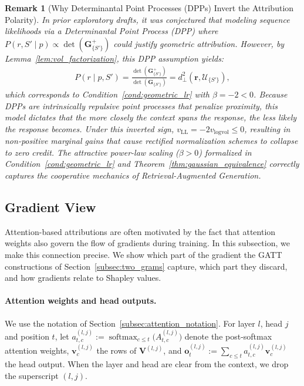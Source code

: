 \documentclass{article}
\newtheorem{remark}[theorem]{Remark}
\begin{document}
\begin{remark}[Why Determinantal Point Processes (DPPs) Invert the Attribution Polarity]
In prior exploratory drafts, it was conjectured that modeling sequence likelihoods via a Determinantal Point Process (DPP) where $P(r, S' \mid p) \propto \det(\mathbf{G}^{+}_{\{S'\}})$ could justify geometric attribution. However, by Lemma~\ref{lem:vol_factorization}, this DPP assumption yields:
\begin{align}
    P(r \mid p, S') = \frac{\det(\mathbf{G}^{+}_{\{S'\}})}{\det(\mathbf{G}_{\{S'\}})} = d_{\perp}^2(\mathbf{r}, \mathcal{U}_{\{S'\}}),
\end{align}
which corresponds to Condition~\ref{cond:geometric_lr} with $\beta = -2 < 0$. Because DPPs are intrinsically \emph{repulsive} point processes that penalize proximity, this model dictates that the more closely the context spans the response, the \emph{less} likely the response becomes. Under this inverted sign, $v_{\text{LL}} = -2 v_{\text{logvol}} \le 0$, resulting in non-positive marginal gains that cause rectified normalization schemes to collapse to zero credit. The attractive power-law scaling ($\beta > 0$) formalized in Condition~\ref{cond:geometric_lr} and Theorem~\ref{thm:gaussian_equivalence} correctly captures the cooperative mechanics of Retrieval-Augmented Generation.
\end{remark}



\subsection{Gradient View}
\label{subsec:gradient_view}

Attention-based attributions are often motivated by the fact that attention weights also govern the flow of gradients during training. In this subsection, we make this connection precise. We show which part of the gradient the GATT constructions of Section~\ref{subsec:two_grams} capture, which part they discard, and how gradients relate to Shapley values.

\paragraph{Attention weights and head outputs.}
We use the notation of Section~\ref{subsec:attention_notation}. For layer $l$, head $j$ and position $t$, let $a^{(l,j)}_{t,c} := \operatorname{softmax}_{c \le t}\big(A^{(l,j)}_{t,c}\big)$ denote the post-softmax attention weights, $\mathbf{v}^{(l,j)}_c$ the rows of $\mathbf{V}^{(l,j)}$, and $\mathbf{o}^{(l,j)}_t := \sum_{c \le t} a^{(l,j)}_{t,c} \mathbf{v}^{(l,j)}_c$ the head output. When the layer and head are clear from the context, we drop the superscript $(l,j)$.
\end{document}
